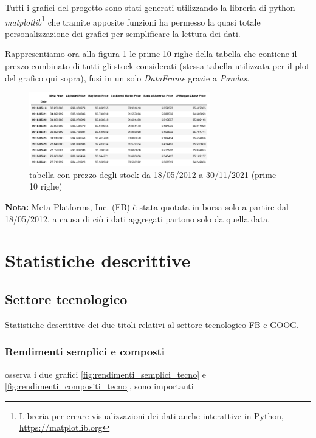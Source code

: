 \documentclass{article}
\begin{document}
Tutti i grafici del progetto sono stati generati utilizzando la libreria di python \emph{matplotlib}\footnote{Libreria per creare visualizzazioni dei dati anche interattive in Python, \href{https://matplotlib.org}{https://matplotlib.org}}
che tramite apposite funzioni ha permesso la quasi totale personalizzazione dei grafici per semplificare la lettura dei dati.

Rappresentiamo ora alla figura \ref{fig:all_stocks_table_10} le prime 10 righe della tabella che contiene il prezzo combinato di tutti gli stock considerati (stessa tabella utilizzata per il plot del grafico qui sopra), 
fusi in un solo \emph{DataFrame} grazie a \emph{Pandas}.

\begin{figure}[h]
  \centering
  \includegraphics[width=0.7\textwidth]{stocks_combined_first_10.png}
  \caption{tabella con prezzo degli stock da 18/05/2012 a 30/11/2021 (prime 10 righe)}
  \label{fig:all_stocks_table_10}
\end{figure}

\textbf{Nota:} Meta Platforms, Inc. (FB) è stata quotata in borsa solo a partire dal 18/05/2012, a causa di ciò i dati aggregati partono
solo da quella data.

\section{Statistiche descrittive}

\subsection{Settore tecnologico}

Statistiche descrittive dei due titoli relativi al settore tecnologico FB e GOOG.

\subsubsection{Rendimenti semplici e composti}

osserva i due grafici \ref{fig:rendimenti_semplici_tecno} e \ref{fig:rendimenti_compositi_tecno}, sono importanti
\end{document}
